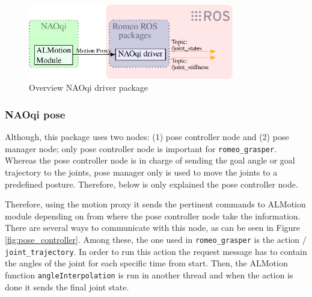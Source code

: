 \documentclass[12pt,a4paper,final,twoside,openright]{report}
\begin{document}
\begin{figure}[h]
\centering
\includegraphics[width=0.8\textwidth]{images/naoqi_driver.eps}
\caption{Overview NAOqi driver package\label{fig:naoqi_driver}}
\end{figure}

\subsubsection{NAOqi pose}

Although, this package uses two nodes: (1) pose controller node and (2) pose manager node; only pose controller node is important for \texttt{romeo\_grasper}. Whereas the pose controller node is in charge of sending the goal angle or goal trajectory to the joints, pose manager only is used to move the joints to a predefined posture. Therefore, below is only explained the pose controller node.

Therefore, using the motion proxy it sends the pertinent commands to ALMotion module depending on from where the pose controller node take the information. There are several ways to communicate with this node, as can be seen in Figure \ref{fig:pose_controller}. Among these, the one used in \texttt{romeo\_grasper} is the action \texttt{$/$joint\_trajectory}. In order to run this action the request message has to contain the angles of the joint for each specific time from start. Then, the ALMotion function \texttt{angleInterpolation} is run in another thread and when the action is done it sends the final joint state.

\end{document}
